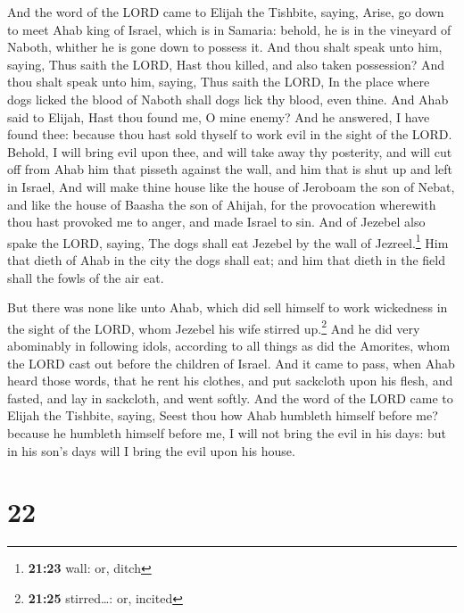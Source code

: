  And the word of the LORD came to Elijah the Tishbite,
saying,  Arise, go down to meet Ahab king of Israel,
which is in Samaria: behold, he is in the vineyard of Naboth, whither he
is gone down to possess it.  And thou shalt speak unto
him, saying, Thus saith the LORD, Hast thou killed, and also taken
possession? And thou shalt speak unto him, saying, Thus saith the LORD,
In the place where dogs licked the blood of Naboth shall dogs lick thy
blood, even thine.  And Ahab said to Elijah, Hast thou
found me, O mine enemy? And he answered, I have found thee: because thou
hast sold thyself to work evil in the sight of the LORD. 
Behold, I will bring evil upon thee, and will take away thy posterity,
and will cut off from Ahab him that pisseth against the wall, and him
that is shut up and left in Israel,  And will make thine
house like the house of Jeroboam the son of Nebat, and like the house of
Baasha the son of Ahijah, for the provocation wherewith thou hast
provoked me to anger, and made Israel to sin.  And of
Jezebel also spake the LORD, saying, The dogs shall eat Jezebel by the
wall of Jezreel.\footnote{\textbf{21:23} wall: or, ditch}
 Him that dieth of Ahab in the city the dogs shall eat;
and him that dieth in the field shall the fowls of the air eat.

 But there was none like unto Ahab, which did sell
himself to work wickedness in the sight of the LORD, whom Jezebel his
wife stirred up.\footnote{\textbf{21:25} stirred\ldots: or, incited}
 And he did very abominably in following idols, according
to all things as did the Amorites, whom the LORD cast out before the
children of Israel.  And it came to pass, when Ahab heard
those words, that he rent his clothes, and put sackcloth upon his flesh,
and fasted, and lay in sackcloth, and went softly.  And
the word of the LORD came to Elijah the Tishbite, saying,
 Seest thou how Ahab humbleth himself before me? because
he humbleth himself before me, I will not bring the evil in his days:
but in his son's days will I bring the evil upon his house.

\hypertarget{section-21}{%
\section{22}\label{section-21}}

